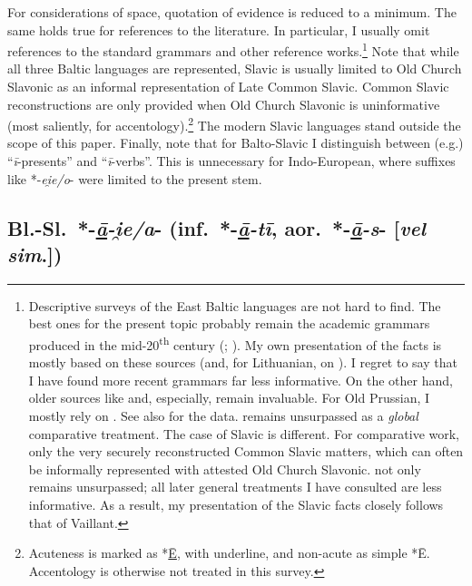 \documentclass[output=paper,colorlinks,citecolor=brown]{langscibook}
\begin{document}
For considerations of space, quotation of evidence is reduced to a minimum. The same holds true for references to the literature. In particular, I usually omit references to the standard grammars and other reference works.\footnote{Descriptive surveys of the East Baltic languages are not hard to find. The best ones for the present topic probably remain the academic grammars produced in the mid-20\textsuperscript{th} century (; ). My own presentation of the facts is mostly based on these sources (and, for Lithuanian, on \citealt{Jakaitiene1973}). I regret to say that I have found more recent grammars far less informative. On the other hand, older sources like \citet[488--551]{Skardzius1943} and, especially, \citet[618--651]{Endzelin1923} remain invaluable. For Old Prussian, I mostly rely on \citet[107--114]{Endzelin1943}. See also \citet{Smoczynski2005} for the data. \citet[360--374]{Stang1966} remains unsurpassed as a \textit{global} comparative treatment. The case of Slavic is different. For comparative work, only the very securely reconstructed Common Slavic matters, which can often be informally represented with attested Old Church Slavonic. \citet{Vaillant1966} not only remains unsurpassed; all later general treatments I have consulted are less informative. As a result, my presentation of the Slavic facts closely follows that of Vaillant.} Note that while all three Baltic languages are represented, Slavic is usually limited to Old Church Slavonic as an informal representation of Late Common Slavic. Common Slavic reconstructions are only provided when Old Church Slavonic is uninformative (most saliently, for accentology).\footnote{Acuteness is marked as *\underline{Ē}, with underline, and non-acute as simple *Ē. Accentology is otherwise not treated in this survey.} The modern Slavic languages stand outside the scope of this paper. Finally, note that for Balto-Slavic I distinguish between (e.g.) “\textit{ī}-presents” and “\textit{ī}-verbs”. This is unnecessary for Indo-European, where suffixes like *-\textit{ei̯e/o}- were limited to the present stem.

\subsection{Bl.-Sl.\ *-\textit{\underline{ā}-i̯e/a}- (inf.\ *-\textit{\underline{ā}-tī}, aor.\ *-\textit{\underline{ā}-s}- [\textit{vel sim}.])}
\label{sec:BSlaje}
\end{document}
